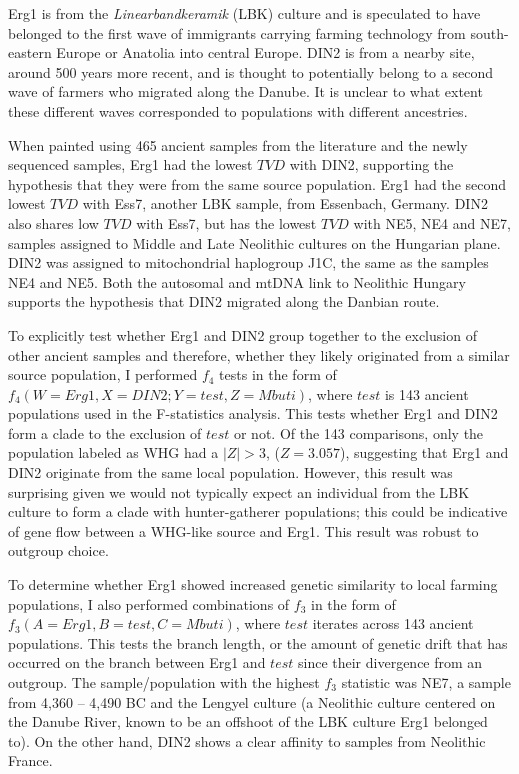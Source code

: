 Erg1 is from the \textit{Linearbandkeramik} (LBK) culture and is speculated to have belonged to the first wave of immigrants carrying farming technology from south-eastern Europe or Anatolia into central Europe. DIN2 is from a nearby site, around 500 years more recent, and is thought to potentially belong to a second wave of farmers who migrated along the Danube. It is unclear to what extent these different waves corresponded to populations with different ancestries.  

When painted using 465 ancient samples from the literature and the newly sequenced samples, Erg1 had the lowest $TVD$ with DIN2, supporting the hypothesis that they were from the same source population. Erg1 had the second lowest $TVD$ with Ess7, another LBK sample, from Essenbach, Germany. DIN2 also shares low $TVD$ with Ess7, but has the lowest $TVD$ with NE5, NE4 and NE7, samples assigned to Middle and Late Neolithic cultures on the Hungarian plane. DIN2 was assigned to mitochondrial haplogroup J1C, the same as the samples NE4 and NE5. Both the autosomal and mtDNA link to Neolithic Hungary supports the hypothesis that DIN2 migrated along the Danbian route.   

To explicitly test whether Erg1 and DIN2 group together to the exclusion of other ancient samples and therefore, whether they likely originated from a similar source population, I performed $f_{4}$ tests in the form of $f_{4}(W=Erg1, X=DIN2; Y=test, Z=Mbuti)$, where $test$ is 143 ancient populations used in the F-statistics analysis. This tests whether Erg1 and DIN2 form a clade to the exclusion of $test$ or not. Of the 143 comparisons, only the population labeled as WHG had a $|Z|>3$, ($Z=3.057$), suggesting that Erg1 and DIN2 originate from the same local population. However, this result was surprising given we would not typically expect an individual from the LBK culture to form a clade with hunter-gatherer populations; this could be indicative of gene flow between a WHG-like source and Erg1. This result was robust to outgroup choice.  

To determine whether Erg1 showed increased genetic similarity to local farming populations, I also performed combinations of $f_{3}$ in the form of $f_{3}(A=Erg1, B=test, C=Mbuti)$, where $test$ iterates across 143 ancient populations. This tests the branch length, or the amount of genetic drift that has occurred on the branch between Erg1 and $test$ since their divergence from an outgroup. The sample/population with the highest $f_{3}$ statistic was NE7, a sample from 4,360 – 4,490 BC and the Lengyel culture (a Neolithic culture centered on the Danube River, known to be an offshoot of the LBK culture Erg1 belonged to). On the other hand, DIN2 shows a clear affinity to samples from Neolithic France.

